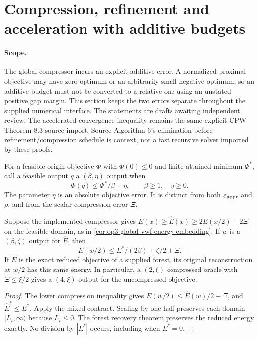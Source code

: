 \section[Mixed additive accuracy]{Compression, refinement and acceleration with additive budgets}
\label{sec:op3-mixed-additive-oracles}

\paragraph{Scope.}
The global compressor incurs an explicit additive error. A normalized
proximal objective may have zero optimum or an arbitrarily small negative
optimum, so an additive budget must not be converted to a relative one
using an unstated positive gap margin. This section keeps the two errors
separate throughout the supplied numerical interface. The statements are
\statusproved{} drafts awaiting independent review. The accelerated
convergence inequality remains the same explicit CPW Theorem 8.3 source
import. Source Algorithm 6's elimination-before-refinement/compression
schedule is context, not a fast recursive solver imported by these proofs.

For a feasible-origin objective $\Phi$ with $\Phi(0)\leq0$ and finite
attained minimum $\Phi^*$, call a feasible output $q$ a
$(\beta,\eta)$ output when
\begin{equation}
 \Phi(q)\leq\Phi^*/\beta+\eta,\qquad \beta\geq1,\quad\eta\geq0.
 \label{eq:op3-mixed-oracle-contract}
\end{equation}
The parameter $\eta$ is an absolute objective error. It is distinct from
both $\varepsilon_{\mathrm{appr}}$ and $\rho$, and from the scalar compression error $\Xi$.

\begin{lemma}
\label{lem:op3-mixed-compression-embedding}
Suppose the implemented compressor gives
$E(x)\geq\widehat E(x)\geq2E(x/2)-2\Xi$ on the feasible domain,
as in \cref{cor:op3-global-vwf-energy-embedding}.
If $w$ is a $(\beta,\zeta)$ output for $\widehat E$, then
\[
 E(w/2)\leq E^*/(2\beta)+\zeta/2+\Xi.
\]
If $E$ is the exact reduced objective of a supplied forest, its original
reconstruction at $w/2$ has this same energy. In particular, a
$(2,\xi)$ compressed oracle with $\Xi\leq\xi/2$ gives a
$(4,\xi)$ output for the uncompressed objective.
\end{lemma}
\begin{proof}
The lower compression inequality gives
$E(w/2)\leq\widehat E(w)/2+\Xi$, and
$\widehat E^*\leq E^*$. Apply the mixed contract. Scaling by one half
preserves each domain $[L_i,\infty)$ because $L_i\leq0$.
The forest recovery theorem preserves the reduced energy exactly.
No division by $|E^*|$ occurs, including when $E^*=0$.
\end{proof}

